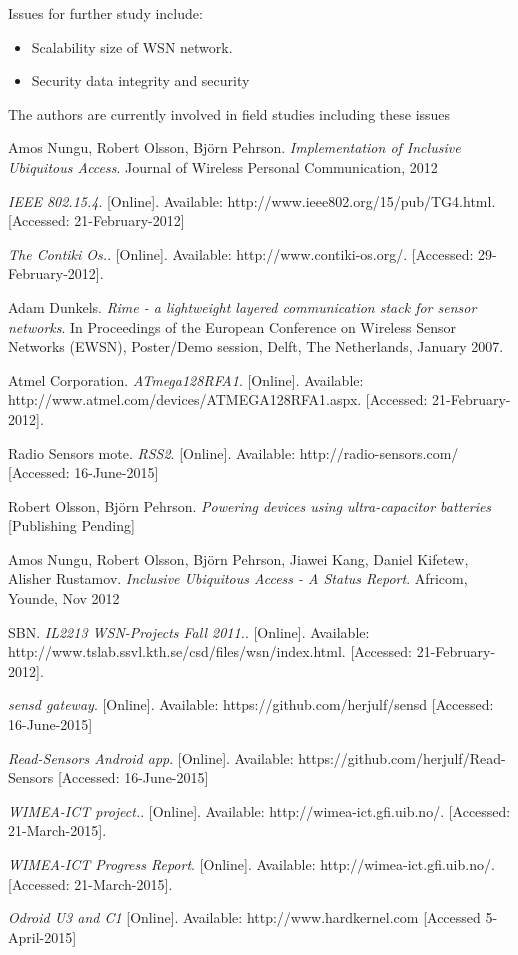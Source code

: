 \documentclass[conference, a4paper,10pt,twocolumn]{IEEEtran}
\begin{document}
Issues for further study include: 

\begin{itemize}
\item Scalability 
\itemHow size of WSN network.

\item Security
\itemHow data integrity and security

\end{itemize} 

The authors are currently involved in field studies including these issues

\begin{thebibliography}{1}

 Amos Nungu, Robert Olsson, Bj\"{o}rn Pehrson. \emph{Implementation of Inclusive Ubiquitous Access}. 
Journal of Wireless Personal Communication, 2012

  \emph{IEEE 802.15.4}. 
[Online]. Available: http://www.ieee802.org/15/pub/TG4.html. [Accessed: 21-February-2012]

  \emph{The Contiki Os.}. 
[Online]. Available: http://www.contiki-os.org/. [Accessed: 29-February-2012].

 Adam Dunkels. \emph{Rime - a lightweight layered communication stack for sensor networks}.   In Proceedings of the European Conference on Wireless Sensor Networks (EWSN), Poster/Demo session, Delft, The Netherlands, January 2007.

 Atmel Corporation. \emph{ATmega128RFA1}. 
[Online]. Available: http://www.atmel.com/devices/ATMEGA128RFA1.aspx. [Accessed: 21-February-2012].

 Radio Sensors mote. \emph{RSS2}. 
[Online]. Available: http://radio-sensors.com/ [Accessed: 16-June-2015]

 Robert Olsson, Bj\"{o}rn Pehrson. \emph{Powering devices using ultra-capacitor batteries}
[Publishing Pending]

 Amos Nungu, Robert Olsson, Bj\"{o}rn Pehrson, Jiawei Kang, Daniel Kifetew, Alisher Rustamov. \emph{Inclusive Ubiquitous Access - A Status Report}. 
Africom, Younde, Nov 2012

 SBN. \emph{IL2213 WSN-Projects Fall 2011.}. 
[Online]. Available: http://www.tslab.ssvl.kth.se/csd/files/wsn/index.html. [Accessed: 21-February-2012].

  \emph{sensd gateway}. 
[Online]. Available: https://github.com/herjulf/sensd [Accessed: 16-June-2015]

  \emph{Read-Sensors Android app}. 
[Online]. Available: https://github.com/herjulf/Read-Sensors [Accessed: 16-June-2015]

  \emph{WIMEA-ICT project.}. 
[Online]. Available: http://wimea-ict.gfi.uib.no/. [Accessed: 21-March-2015].

  \emph{WIMEA-ICT Progress Report}. 
[Online]. Available: http://wimea-ict.gfi.uib.no/. [Accessed: 21-March-2015].

 \emph{Odroid U3 and C1}
[Online]. Available: http://www.hardkernel.com [Accessed 5-April-2015]
\end{thebibliography}
\end{document}

